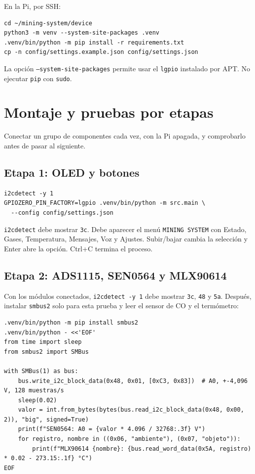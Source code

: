 \documentclass[11pt,a4paper]{article}
\begin{document}
En la Pi, por SSH:

\begin{lstlisting}
cd ~/mining-system/device
python3 -m venv --system-site-packages .venv
.venv/bin/python -m pip install -r requirements.txt
cp -n config/settings.example.json config/settings.json
\end{lstlisting}

La opción \texttt{--system-site-packages} permite usar el \texttt{lgpio}
instalado por APT. No ejecutar \texttt{pip} con \texttt{sudo}.

\section{Montaje y pruebas por etapas}
\label{sec:pruebas}

Conectar un grupo de componentes cada vez, con la Pi apagada, y comprobarlo
antes de pasar al siguiente.

\subsection*{Etapa 1: OLED y botones}

\begin{lstlisting}
i2cdetect -y 1
GPIOZERO_PIN_FACTORY=lgpio .venv/bin/python -m src.main \
  --config config/settings.json
\end{lstlisting}

\texttt{i2cdetect} debe mostrar \texttt{3c}. Debe aparecer el menú
\texttt{MINING SYSTEM} con Estado, Gases, Temperatura, Mensajes, Voz y Ajustes.
Subir/bajar cambia la selección y Enter abre la opción. Ctrl+C termina el
proceso.

\subsection*{Etapa 2: ADS1115, SEN0564 y MLX90614}

Con los módulos conectados, \texttt{i2cdetect -y 1} debe mostrar \texttt{3c},
\texttt{48} y \texttt{5a}. Después, instalar \texttt{smbus2} solo para esta
prueba y leer el sensor de CO y el termómetro:

\begin{lstlisting}
.venv/bin/python -m pip install smbus2
.venv/bin/python - <<'EOF'
from time import sleep
from smbus2 import SMBus

with SMBus(1) as bus:
    bus.write_i2c_block_data(0x48, 0x01, [0xC3, 0x83])  # A0, +-4,096 V, 128 muestras/s
    sleep(0.02)
    valor = int.from_bytes(bytes(bus.read_i2c_block_data(0x48, 0x00, 2)), "big", signed=True)
    print(f"SEN0564: A0 = {valor * 4.096 / 32768:.3f} V")
    for registro, nombre in ((0x06, "ambiente"), (0x07, "objeto")):
        print(f"MLX90614 {nombre}: {bus.read_word_data(0x5A, registro) * 0.02 - 273.15:.1f} °C")
EOF
\end{lstlisting}
\end{document}
